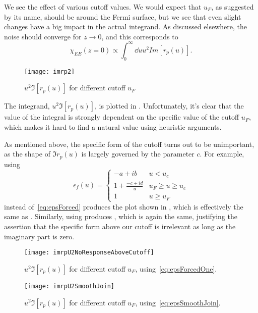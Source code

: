 \documentclass[11pt]{article}
\begin{document}
	We see  the effect of various cutoff values.
	We would expect that $u_F$, as suggested by its name, should be around the Fermi surface, but we see that even slight changes have a big impact in the actual integrand.
	As discussed elsewhere, the noise should converge for $z\rightarrow 0$, and this corresponds to
	\begin{equation}
		\chi_{EE}(z = 0) \propto \int_0^\infty \dd{u} u^2 Im[r_p(u)].
	\end{equation}

	\begin{figure}[htp]
		\centering
		\texttt{[image: imrp2]}
		\caption{$u^2 \Im[r_p(u)]$ for different cutoff $u_F$} \label{fig:u2imrpVsCutoff}
	\end{figure}
	The integrand, $u^2 \Im[r_p(u)]$, is plotted in .
	Unfortunately, it's clear that the value of the integral is strongly dependent on the specific value of the cutoff $u_F$, which makes it hard to find a natural value using heuristic arguments.

	As mentioned above, the specific form of the cutoff turns out to be unimportant, as the shape of $\Im r_p(u)$ is largely governed by the parameter $c$.
	For example, using
	\begin{equation}
		\epsilon_f(u) =
		\begin{cases}
			-a + i b & u < u_c \\
			1 + \frac{-c + i d}{u} &  u_F \geq u \geq u_c \\
			1                      &  u \geq u_F
		\end{cases} \label{eq:epsForcedOne}
	\end{equation}
	instead of~\eqref{eq:epsForced} produces the plot shown in , which is effectively the same as .
	Similarly, using  produces , which is again the same, justifying the assertion that the specific form above our cutoff is irrelevant as long as the imaginary part is zero.
	\begin{figure}[htp]
		\centering
		\texttt{[image: imrpU2NoResponseAboveCutoff]}
		\caption{$u^2 \Im[r_p(u)]$ for different cutoff $u_F$, using~\eqref{eq:epsForcedOne}.} \label{fig:u2imrpVsCutoffNoResponseAbove}
	\end{figure}

	\begin{figure}[htp]
		\centering
		\texttt{[image: imrpU2SmoothJoin]}
		\caption{$u^2 \Im[r_p(u)]$ for different cutoff $u_F$, using~\eqref{eq:epsSmoothJoin}.} \label{fig:u2imrpVsCutoffSmoothJoin}
	\end{figure}
\end{document}
